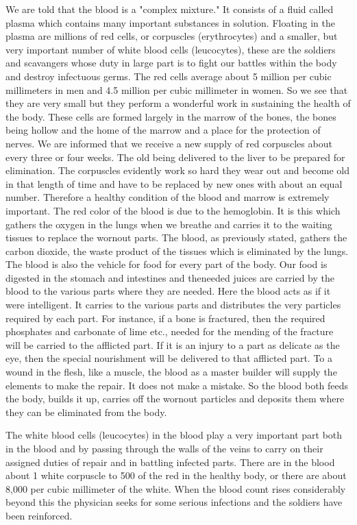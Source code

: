We are told that the blood is a "complex mixture." It consists of a fluid called plasma which
contains many important substances in solution. Floating in the plasma are millions of red
cells, or corpuscles (erythrocytes) and a smaller, but very important number of white blood
cells (leucocytes), these are the soldiers and scavangers whose duty in large part is to fight
our battles within the body and destroy infectuous germs. The red cells average about 5
million per cubic millimeters in men and 4.5 million per cubic millimeter in women. So we
see that they are very small but they perform a wonderful work in sustaining the health of the
body. These cells are formed largely in the marrow of the bones, the bones being hollow and
the home of the marrow and a place for the protection of nerves. We are informed that we
receive a new supply of red corpuscles about every three or four weeks. The old being
delivered to the liver to be prepared for elimination. The corpuscles evidently work so hard
they wear out and become old in that length of time and have to be replaced by new ones
with about an equal number. Therefore a healthy condition of the blood and marrow is
extremely important. The red color of the blood is due to the hemoglobin. It is this which
gathers the oxygen in the lungs when we breathe and carries it to the waiting tissues to
replace the wornout parts. The blood, as previously stated, gathers the carbon dioxide, the
waste product of the tissues which is eliminated by the lungs. The blood is also the vehicle
for food for every part of the body. Our food is digested in the stomach and intestines and theneeded juices are carried by the blood to the various parts where they are needed. Here the
blood acts as if it were intelligent. It carries to the various parts and distributes the very
particles required by each part. For instance, if a bone is fractured, then the required
phosphates and carbonate of lime etc., needed for the mending of the fracture will be carried
to the afflicted part. If it is an injury to a part as delicate as the eye, then the special
nourishment will be delivered to that afflicted part. To a wound in the flesh, like a muscle,
the blood as a master builder will supply the elements to make the repair. It does not make a
mistake. So the blood both feeds the body, builds it up, carries off the wornout particles and
deposits them where they can be eliminated from the body.

The white blood cells (leucocytes) in the blood play a very important part both in the blood
and by passing through the walls of the veins to carry on their assigned duties of repair and in
battling infected parts. There are in the blood about 1 white corpuscle to 500 of the red in the
healthy body, or there are about 8,000 per cubic millimeter of the white. When the blood
count rises considerably beyond this the physician seeks for some serious infections and the
soldiers have been reinforced.

